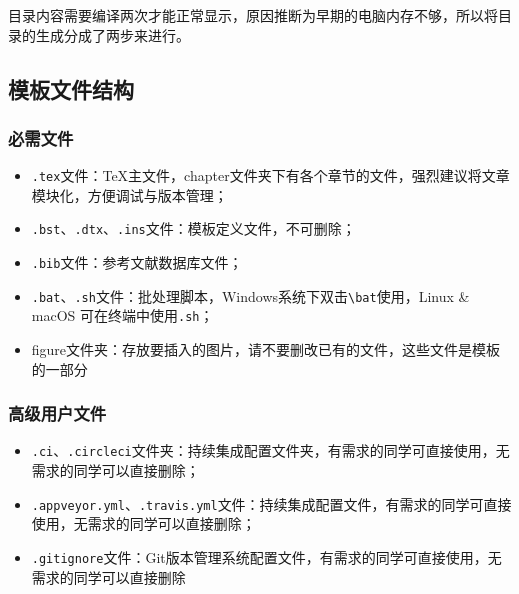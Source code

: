 目录内容需要编译两次才能正常显示，原因推断为早期的电脑内存不够，所以将目录的生成分成了两步来进行。

\subsection{模板文件结构}
\subsubsection{必需文件}
\begin{itemize}[noitemsep,topsep=0pt,parsep=0pt,partopsep=0pt]
  \item \verb|.tex|文件：\TeX 主文件，chapter文件夹下有各个章节的文件，强烈建议将文章模块化，方便调试与版本管理；
  \item \verb|.bst|、\verb|.dtx|、\verb|.ins|文件：模板定义文件，不可删除；
  \item \verb|.bib|文件：参考文献数据库文件；
  \item \verb|.bat|、\verb|.sh|文件：批处理脚本，Windows系统下双击\verb|\bat|使用，Linux \& macOS 可在终端中使用\verb|.sh|；
  \item figure文件夹：存放要插入的图片，请不要删改已有的文件，这些文件是模板的一部分
\end{itemize}

\subsubsection{高级用户文件}
\begin{itemize}[noitemsep,topsep=0pt,parsep=0pt,partopsep=0pt]
  \item \verb|.ci|、\verb|.circleci|文件夹：持续集成配置文件夹，有需求的同学可直接使用，无需求的同学可以直接删除；
  \item \verb|.appveyor.yml|、\verb|.travis.yml|文件：持续集成配置文件，有需求的同学可直接使用，无需求的同学可以直接删除；
  \item \verb|.gitignore|文件：Git版本管理系统配置文件，有需求的同学可直接使用，无需求的同学可以直接删除
\end{itemize}